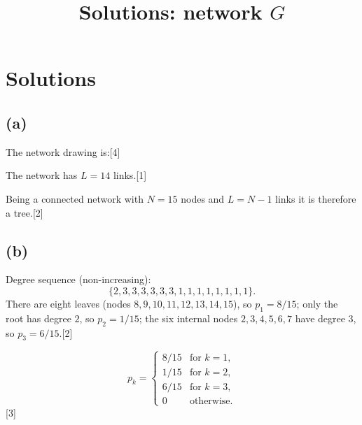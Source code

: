 \documentclass[11pt,a4paper]{article}
\title{Solutions: network $G$}
\author{}
\date{}
\newcommand{\mk}[1]{\hfill{\small[#1]}}
\begin{document}
\maketitle

\section*{Solutions}

\subsection*{(a)}

The network drawing is:\mk{4}

\begin{center}
\end{center}

\noindent The network has $L = 14$ links.\mk{1}

\noindent Being a connected network with $N = 15$ nodes and $L = N - 1$ links it is therefore a tree.\mk{2}

\subsection*{(b)}

\noindent Degree sequence (non-increasing):
\[
  \{2, 3, 3, 3, 3, 3, 3, 1, 1, 1, 1, 1, 1, 1, 1\}.
\]
There are eight leaves (nodes $8, 9, 10, 11, 12, 13, 14, 15$), so $p_1 = 8/15$; only the root has degree $2$, so $p_2 = 1/15$; the six internal nodes $2,3,4,5,6,7$ have degree $3$, so $p_3 = 6/15$.\mk{2}

\[
  p_k =
  \begin{cases}
    8/15 & \text{for } k = 1, \\
    1/15 & \text{for } k = 2, \\
    6/15 & \text{for } k = 3, \\
    0    & \text{otherwise.}
  \end{cases}
\]
\noindent\mbox{}\hfill{\small[3]}
\end{document}
